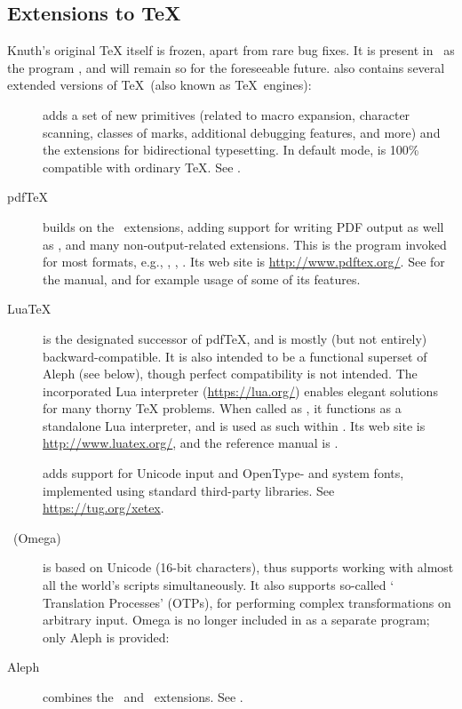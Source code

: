 \documentclass{article}
\begin{document}
\subsection{Extensions to \protect\TeX}
\label{sec:tex-extensions}

Knuth's original \TeX{} itself is frozen, apart from rare bug fixes. It
is present in \TL\ as the program , and will remain so
for the foreseeable future.  \TL{} also contains several extended versions of
\TeX\ (also known as \TeX\ engines):

\begin{description}

\item [\eTeX] adds a set of new primitives
\label{text:etex} (related to macro expansion, character scanning,
classes of marks, additional debugging features, and more) and the
\TeXXeT{} extensions for bidirectional typesetting.  In default mode,
\eTeX{} is 100\% compatible with ordinary \TeX. See
.

\item [pdf\TeX] builds on the \eTeX\ extensions, adding support for
writing PDF output as well as \dvi{}, and many non-output-related
extensions.  This is the program invoked for most formats, e.g.,
, , .  Its web site is
\url{http://www.pdftex.org/}.  See
 for the manual, and
 for example
usage of some of its features.

\item [Lua\TeX] is the designated successor of pdf\TeX,
and is mostly (but not entirely) backward-compatible.  It is also
intended to be a functional superset of Aleph (see below), though
perfect compatibility is not intended. The incorporated Lua
interpreter (\url{https://lua.org/}) enables elegant solutions for
many thorny \TeX{} problems. When called as , it
functions as a standalone Lua interpreter, and is used as such
within \TL.  Its web site is \url{http://www.luatex.org/}, and the
reference manual is .

\item [\XeTeX] adds support for Unicode input and OpenType- and system
fonts, implemented using standard third-party libraries.  See
\url{https://tug.org/xetex}.

\item [\OMEGA\ (Omega)] is based on Unicode (16-bit characters), thus
supports working with almost all the world's scripts simultaneously. It
also supports so-called `\OMEGA{} Translation Processes' (OTPs),
for performing complex transformations on arbitrary input.  Omega is no
longer included in \TL{} as a separate program; only Aleph is provided:

\item [Aleph] combines the \OMEGA\ and \eTeX\ extensions.
See .

\end{description}
\end{document}
